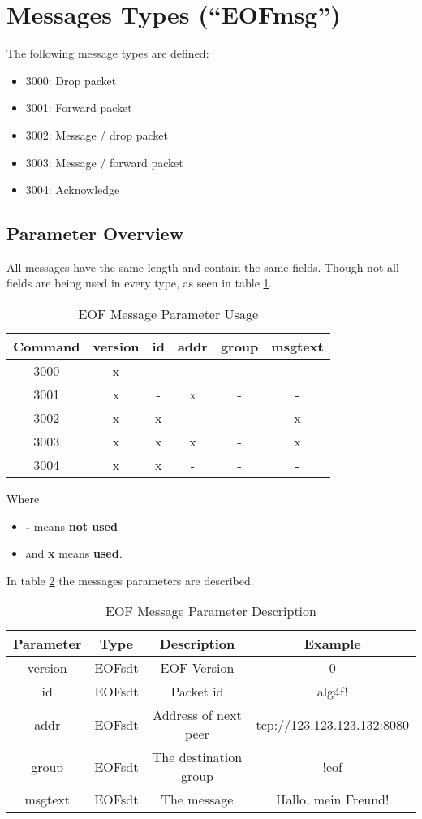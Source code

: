 \section{Messages Types ("`EOFmsg"')}
\label{eofmsg}
The following message types are defined:

\begin{itemize}
\item 3000: Drop packet
\item 3001: Forward packet
\item 3002: Message / drop packet
\item 3003: Message / forward packet
\item 3004: Acknowledge
\end{itemize}
\subsection{Parameter Overview}
All messages have the same length and contain the same fields.
Though not all fields are being used in every type, as seen in table
\ref{eofmessageparameteroverview}.
\begin{longtable}{|c|c|c|c|c|c|}
\caption{EOF Message Parameter Usage}
\label{eofmessageparameteroverview}
\\
\hline
\textbf{Command} & \textbf{version} & \textbf{id} & \textbf{addr} & \textbf{group} & \textbf{msgtext}\\
\hline
3000 &x & - & - & - & - \\
\hline
3001 &x & - & x & - & - \\
\hline
3002 &x & x & - & - & x \\
\hline
3003 &x & x & x & - & x \\
\hline
3004 &x & x & - & - & -\\
\hline
\end{longtable}
Where 
\begin{itemize}
\item \textbf{-} means \textbf{not used}
\item and \textbf{x} means \textbf{used}.
\end{itemize}
In table \ref{eofmessagedescription} the messages
parameters are described.
\begin{longtable}{|c|c|c|c|}
\caption{EOF Message Parameter Description}
\label{eofmessagedescription}
\\
\hline
\textbf{Parameter} & \textbf{Type} & \textbf{Description} & \textbf{Example}\\
\hline
version & EOFsdt & EOF Version & 0\\
\hline
id & EOFsdt & Packet id & alg4f!\\
\hline
addr & EOFsdt & Address of next peer & tcp://123.123.123.132:8080\\
\hline
group & EOFsdt & The destination group & !eof\\
\hline
msgtext & EOFsdt & The message & Hallo, mein Freund!\\
\hline
\end{longtable}
